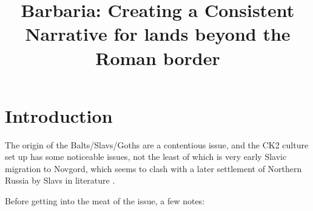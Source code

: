 \documentclass{article}
\title{Barbaria: Creating a Consistent Narrative for lands beyond the Roman border}
\begin{document}
	
	\maketitle
	
	\section{Introduction}
	\label{sec:intro}
	
	The origin of the Balts/Slavs/Goths are a contentious issue, and the CK2 culture set up has some noticeable issues, not the least of which is very early Slavic migration to Novgord, which seems to clash with a later settlement of Northern Russia by Slavs in literature \cite{EmergenceOfRussia}.
	
	Before getting into the meat of the issue, a few notes:
	
\end{document}
